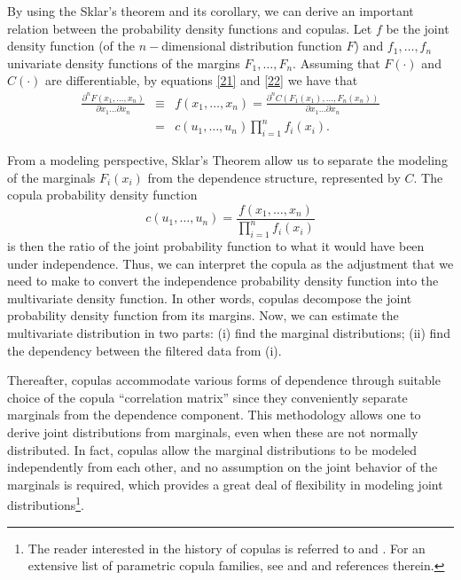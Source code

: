 \documentclass[a4paper,10pt]{article}
\begin{document}
By using the Sklar's theorem and its corollary, we can derive an important relation between the probability density functions and copulas. Let $f$ be the joint density function (of the $n-$dimensional distribution function $F$) and $f_{1},\ldots,f_{n}$ univariate density functions of the margins $F_{1},\ldots,F_{n}$. Assuming that $F\left( \cdot \right) $ and $C\left( \cdot
\right) $ are differentiable, by equations \eqref{21} and \eqref{22} we have that
\begin{eqnarray}
\frac{\partial^{n}F\left( x_{1},\ldots,x_{n}\right) }{\partial x_{1}\ldots\partial x_{n}} &\equiv &f\left( x_{1},\ldots,x_{n}\right) =\frac{	\partial ^{n}C\left( F_{1}\left( x_{1}\right) ,...,F_{n}\left( x_{n}\right)	\right) }{\partial x_{1}\ldots\partial x_{n}} \\
&=&c\left( u_{1},\ldots,u_{n}\right) \prod_{i=1}^{n}f_{i}\left( x_{i}\right) .
\label{23}
\end{eqnarray}

From a modeling perspective, Sklar's Theorem allow us to separate the modeling of the marginals $F_{i}\left( x_{i}\right) $ from the dependence structure, represented by $C$. The copula probability density function 
\begin{equation}
c\left( u_{1},\ldots,u_{n}\right) =\frac{f\left( x_{1},\ldots,x_{n}\right) }{\prod_{i=1}^{n}f_{i}\left( x_{i}\right) }\label{24}
\end{equation}%
is then the ratio of the joint probability function to what it would have been under independence. Thus, we can interpret the copula as the adjustment that we need to make to convert the independence probability density function into the multivariate density function. In other words, copulas decompose the joint probability density function from its margins. Now, we can estimate the multivariate distribution in two parts: (i) find the marginal distributions; (ii) find the dependency between the filtered data from (i). 

Thereafter, copulas accommodate various forms of dependence through suitable choice of the copula ``correlation matrix'' since they conveniently separate marginals from the dependence component. This methodology allows one to derive joint distributions from marginals, even when these are not normally distributed. In fact, copulas allow the marginal distributions to be modeled independently from each other, and no assumption on the joint behavior of the marginals is required, which provides a great deal of flexibility in modeling joint distributions\footnote{The reader interested in the history of copulas is referred to \citet*{schweizer2011} and \citet*{nelsen06}. For an extensive list of parametric copula families, see \citet*{joe97} and \citet*{nelsen06} and references therein.}. 
\end{document}
